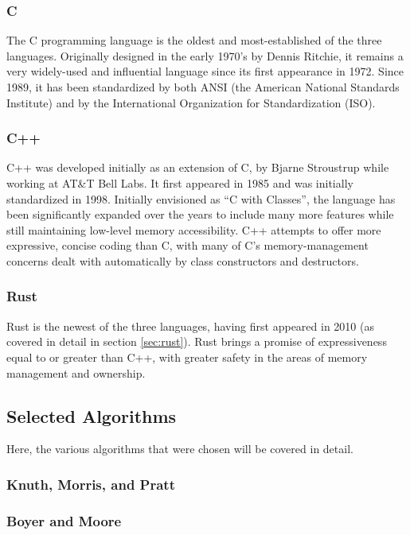 \subsubsection{C}

The C programming language is the oldest and most-established of the three languages. Originally designed in the early 1970's by Dennis Ritchie, it remains a very widely-used and influential language since its first appearance in 1972. Since 1989, it has been standardized by both ANSI (the American National Standards Institute) and by the International Organization for Standardization (ISO).

\subsubsection{C++}

C++ was developed initially as an extension of C, by Bjarne Stroustrup while working at AT\&T Bell Labs. It first appeared in 1985 and was initially standardized in 1998. Initially envisioned as ``C with Classes'', the language has been significantly expanded over the years to include many more features while still maintaining low-level memory accessibility. C++ attempts to offer more expressive, concise coding than C, with many of C's memory-management concerns dealt with automatically by class constructors and destructors.

\subsubsection{Rust}

Rust is the newest of the three languages, having first appeared in 2010 (as covered in detail in section \ref{sec:rust}). Rust brings a promise of expressiveness equal to or greater than C++, with greater safety in the areas of memory management and ownership.

\subsection{Selected Algorithms}

Here, the various algorithms that were chosen will be covered in detail.

\subsubsection{Knuth, Morris, and Pratt}

\subsubsection{Boyer and Moore}


